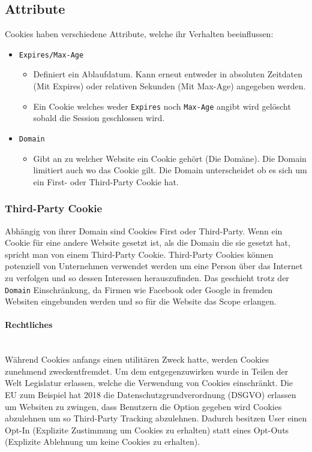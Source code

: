 \documentclass{article}
\newcommand{\paragraphlb}[1]{\paragraph{#1}\mbox{}\\}
\begin{document}
	\subsection{Attribute}
	Cookies haben verschiedene Attribute, welche ihr Verhalten beeinflussen:
	\begin{itemize}
		\item{\texttt{Expires/Max-Age}}
		\begin{itemize}
			\item{Definiert ein Ablaufdatum. Kann erneut entweder in absoluten Zeitdaten (Mit Expires) oder relativen Sekunden (Mit Max-Age) angegeben werden.}
			\item{Ein Cookie welches weder \texttt{Expires} noch \texttt{Max-Age} angibt wird gelöscht sobald die Session geschlossen wird.}
		\end{itemize}
		\item{\texttt{Domain}}
		\begin{itemize}
			\item{Gibt an zu welcher Website ein Cookie gehört (Die Domäne). Die Domain limitiert auch wo das Cookie gilt. Die Domain unterscheidet ob es sich um ein First- oder Third-Party Cookie hat.}
		\end{itemize}
	\end{itemize}
	\subsubsection{Third-Party Cookie}
	Abhängig von ihrer Domain sind Cookies First oder Third-Party. Wenn ein Cookie für eine andere Website gesetzt ist, als die Domain die sie gesetzt hat, spricht man von einem Third-Party Cookie. Third-Party Cookies können potenziell von Unternehmen verwendet werden um eine Person über das Internet zu verfolgen und so dessen Interessen herauszufinden. Das geschieht trotz der \texttt{Domain} Einschränkung, da Firmen wie Facebook oder Google in fremden Websiten eingebunden werden und so für die Website das Scope erlangen.
	\paragraphlb{Rechtliches}
	Während Cookies anfangs einen utilitären Zweck hatte, werden Cookies zunehmend zweckentfremdet. Um dem entgegenzuwirken wurde in Teilen der Welt Legislatur erlassen, welche die Verwendung von Cookies einschränkt. Die EU zum Beispiel hat 2018 die Datenschutzgrundverordnung (DSGVO) erlassen um Websiten zu zwingen, dass Benutzern die Option gegeben wird Cookies abzulehnen um so Third-Party Tracking abzulehnen. Dadurch besitzen User einen Opt-In (Explizite Zustimmung um Cookies zu erhalten) statt eines Opt-Outs (Explizite Ablehnung um keine Cookies zu erhalten).
\end{document}
